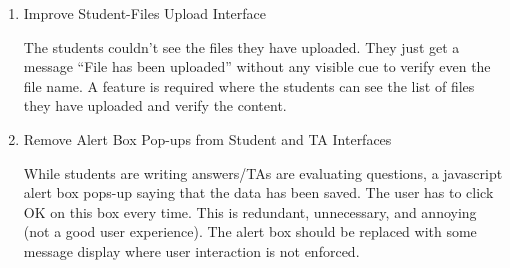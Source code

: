 \begin{enumerate}
\item Improve Student-Files Upload Interface

The students couldn't see the files they have uploaded. They just get a message ``File has been uploaded'' without any visible cue to verify even the file name. A feature is required where the students can see the list of files they have uploaded and verify the content.

\item Remove Alert Box Pop-ups from Student and TA Interfaces

While students are writing answers/TAs are evaluating questions, a javascript alert box pops-up saying that the data has been saved. The user has to click OK on this box every time. This is redundant, unnecessary, and annoying (not a good user experience). The alert box should be replaced with some message display where user interaction is not enforced.

\end{enumerate}

